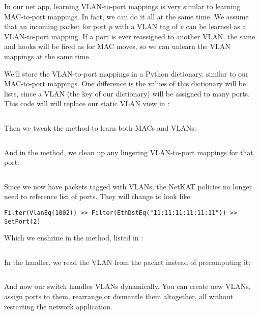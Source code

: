 In our net app, learning VLAN-to-port mappings is very similar to learning MAC-to-port mappings.  In fact, 
we can do it all at the
same time.  We assume that an incoming packet for port $p$ with a VLAN tag of $v$ can be learned as a 
VLAN-to-port mapping.  If a port is ever reassigned to another VLAN, the same  and
 hooks will be fired as for MAC moves, so we can unlearn the VLAN mappings at the same
time.  

We'll store the VLAN-to-port mappings in a Python dictionary, similar to our MAC-to-port mappings.  
One difference is the values of this dictionary will be lists, since a VLAN (the key of our dictionary)
will be assigned to many ports.  This code will will replace our static VLAN view in 
:

\inputminted[firstline=65]{python}{code/handling_vlans/network_information_base_dynamic.py}

Then we tweak the  method to learn both MACs and VLANs:

\inputminted[firstline=13,lastline=24]{python}{code/handling_vlans/network_information_base_dynamic.py}

And in the  method, we clean up any lingering VLAN-to-port mappings for that port:

\inputminted[firstline=55,lastline=60]{python}{code/handling_vlans/network_information_base_dynamic.py}

Since we now have packets tagged with VLANs, the NetKAT policies no longer need to reference list of ports.
They will change to look like:

\begin{verbatim}
Filter(VlanEq(1002)) >> Filter(EthDstEq("11:11:11:11:11:11")) >> SetPort(2)
\end{verbatim}

Which we enshrine in the  method, listed in 
:

\inputminted[firstline=23,lastline=29]{python}{code/handling_vlans/vlan2.py}

In the  handler, we read the VLAN from the packet instead of precomputing it:

\inputminted[firstline=42,lastline=71]{python}{code/handling_vlans/vlan2.py}

And now our switch handles VLANs dynamically.  You can create new VLANs, assign ports to them, rearrange or
dismantle them altogether, all without restarting the network application.  

